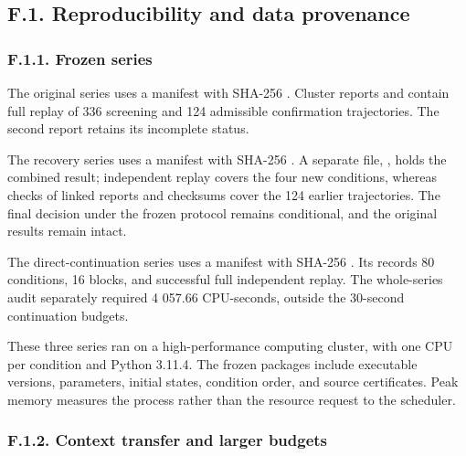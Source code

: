 \documentclass[pdflatex,sn-basic,Numbered]{sn-jnl}
\begin{document}
\subsection*{F.1. Reproducibility and data provenance}\label{f.1.-reproducibility-and-data-provenance}

\subsubsection*{F.1.1. Frozen series}\label{f.1.1.-frozen-series}

The original series  uses a manifest with SHA-256 . Cluster reports  and  contain full replay of 336 screening and 124 admissible confirmation trajectories. The second report retains its incomplete status.

The recovery series  uses a manifest with SHA-256 . A separate file, , holds the combined result; independent replay covers the four new conditions, whereas checks of linked reports and checksums cover the 124 earlier trajectories. The final decision under the frozen protocol remains conditional, and the original results remain intact.

The direct-continuation series  uses a manifest with SHA-256 . Its  records 80 conditions, 16 blocks, and successful full independent replay. The whole-series audit separately required 4 057.66 CPU-seconds, outside the 30-second continuation budgets.

These three series ran on a high-performance computing cluster, with one CPU per condition and Python 3.11.4. The frozen packages include executable versions, parameters, initial states, condition order, and source certificates. Peak memory measures the process rather than the resource request to the scheduler.

\subsubsection*{F.1.2. Context transfer and larger budgets}\label{f.1.2.-context-transfer-and-larger-budgets}
\end{document}
